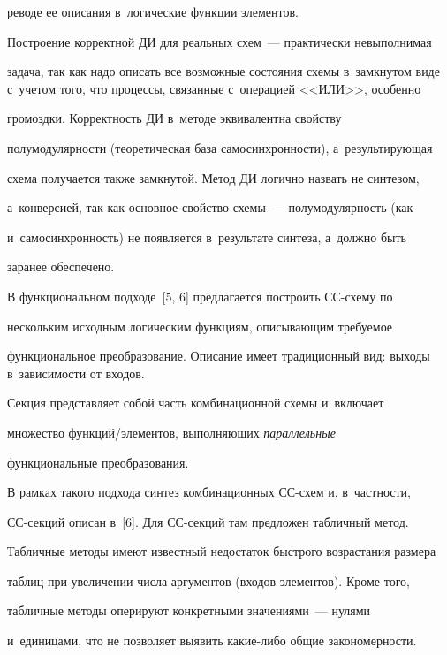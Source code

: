 \noindent


реводе ее описания в~логические функции элементов. 


Построение корректной ДИ для реальных схем~--- практически невыполнимая 


задача, так как надо описать все возможные состояния схемы в~замкнутом виде с~учетом того, что процессы, связанные с~операцией <<ИЛИ>>, особенно 


громоздки. Корректность ДИ в~методе эквивалентна свойству 


полумодулярности (теоретическая база самосинхронности), а~результирующая 


схема получается также замкнутой. Метод ДИ логично назвать не синтезом, 


а~конверсией, так как основное свойство схемы~--- полумодулярность (как 


и~самосинхронность) не появляется в~результате синтеза, а~должно быть 


заранее обеспечено.


   


   В функциональном подходе~[5, 6] предлагается построить СС-схе\-му по 


нескольким исходным логическим функциям, описывающим требуемое 


функциональное преобразование. Описание имеет традиционный вид: выходы в~зависимости от входов.


   


   Секция представляет собой часть комбинационной схемы и~включает 


множество функций/элементов, выполняющих \textit{параллельные} 


функциональные преобразования.


   


   В рамках такого подхода синтез комбинационных СС-схем и, в~частности, 


СС-секций описан в~[6]. Для СС-сек\-ций там предложен табличный метод. 


Табличные методы имеют известный недостаток быстрого возрастания размера 


таблиц при увеличении числа аргументов (входов элементов). Кроме того, 


табличные методы оперируют конкретными значениями~--- нулями 


и~единицами, что не позволяет выявить какие-либо общие закономерности.


